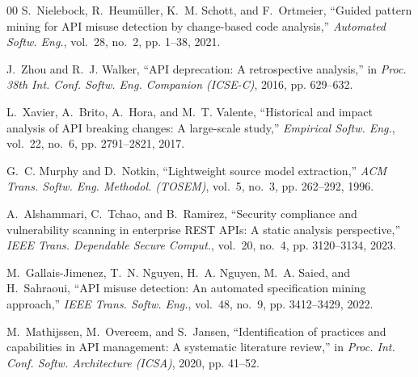 \documentclass[conference]{IEEEtran}
\begin{document}
\begin{thebibliography}{00}
S.~Nielebock, R.~Heum{\"u}ller, K.~M. Schott, and F.~Ortmeier, ``Guided pattern mining for API misuse detection by change-based code analysis,'' \emph{Automated Softw. Eng.}, vol.~28, no.~2, pp. 1--38, 2021.

J.~Zhou and R.~J. Walker, ``API deprecation: A retrospective analysis,'' in \emph{Proc. 38th Int. Conf. Softw. Eng. Companion (ICSE-C)}, 2016, pp. 629--632.

L.~Xavier, A.~Brito, A.~Hora, and M.~T. Valente, ``Historical and impact analysis of API breaking changes: A large-scale study,'' \emph{Empirical Softw. Eng.}, vol.~22, no.~6, pp. 2791--2821, 2017.

G.~C. Murphy and D.~Notkin, ``Lightweight source model extraction,'' \emph{ACM Trans. Softw. Eng. Methodol. (TOSEM)}, vol.~5, no.~3, pp. 262--292, 1996.

A.~Alshammari, C.~Tchao, and B.~Ramirez, ``Security compliance and vulnerability scanning in enterprise REST APIs: A static analysis perspective,'' \emph{IEEE Trans. Dependable Secure Comput.}, vol.~20, no.~4, pp. 3120--3134, 2023.

M.~Gallais-Jimenez, T.~N. Nguyen, H.~A. Nguyen, M.~A. Saied, and H.~Sahraoui, ``API misuse detection: An automated specification mining approach,'' \emph{IEEE Trans. Softw. Eng.}, vol.~48, no.~9, pp. 3412--3429, 2022.

M.~Mathijssen, M.~Overeem, and S.~Jansen, ``Identification of practices and capabilities in API management: A systematic literature review,'' in \emph{Proc. Int. Conf. Softw. Architecture (ICSA)}, 2020, pp. 41--52.

\end{thebibliography}
\end{document}
